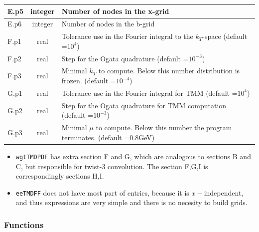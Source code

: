 \documentclass[prd,nofootinbib,eqsecnum,final]{revtex4}
\renewcommand{\(}{\left(}
\renewcommand{\)}{\right)}
\renewcommand{\[}{\left[}
\renewcommand{\]}{\right]}
\begin{document}
\begin{center}
\begin{tabular}{||p{1.5cm}||c||p{12.5cm}||}
\\\hline
E.p5 & integer & Number of nodes in the x-grid
\\\hline
E.p6 & integer & Number of nodes in the b-grid
\\\hline\hline
F.p1 & real & Tolerance use in the Fourier integral to the $k_T$-space (default =$10^{4}$)
\\\hline
F.p2 & real & Step for the Ogata quadrature (default =$10^{-3}$)
\\\hline
F.p3 & real & Minimal $k_T$ to compute. Below this number distribution is frozen. (default =$10^{-4}$)
\\\hline\hline
G.p1 & real & Tolerance use in the Fourier integral for TMM (default =$10^{4}$)
\\\hline
G.p2 & real & Step for the Ogata quadrature for TMM computation (default =$10^{-3}$)
\\\hline
G.p3 & real & Minimal $\mu$ to compute. Below this number the program terminates. (default =$0.8$GeV)
\\\hline\hline
\end{tabular}
\end{center}
\begin{itemize}
\item \texttt{wgtTMDPDF} has extra section F and G, which are analogous to sections B and C, but responsible for twist-3 convolution. The section F,G,I is correspondingly sections H,I.
\item \texttt{eeTMDFF} does not have most part of entries, because it is $x-$independent, and thus expressions are very simple and there is no necesity to build grids.
\end{itemize}

\subsubsection{Functions}
\end{document}
